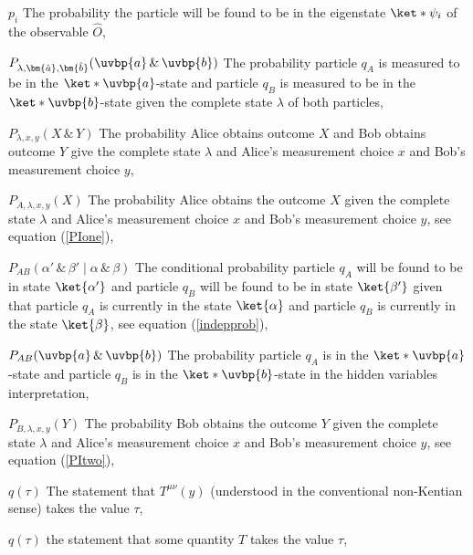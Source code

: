 \begin{thenomenclature}
  \item [{$p_i$}]\begingroup The probability the particle will be found to be in the eigenstate $\ket*{\psi_i}$ of the observable $\hat{O}$, \nomrefpage{}
  \item [{$P_{\lambda,\bm{\hat{a}},\bm{\hat{b}}}(\uvbp{a}\,\&\,\uvbp{b})$}]\begingroup The probability particle $q_A$ is measured to be in the $\ket*{\uvbp{a}}$-state and particle $q_B$ is measured to be in the $\ket*{\uvbp{b}}$-state given the complete state $\lambda$ of both particles, \nomrefpage{}
  \item [{$P_{\lambda,x,y}(X \,\&\, Y)$}]\begingroup The probability  Alice obtains outcome $X$ and Bob obtains outcome $Y$ give the complete state $\lambda$ and Alice's measurement choice $x$ and Bob's measurement choice $y$, \nomrefpage{}
  \item [{$P_{A, \lambda,x,y}(X)$}]\begingroup The probability Alice obtains the outcome $X$ given the complete state $\lambda$ and Alice's measurement choice $x$ and Bob's measurement choice $y$, see equation (\ref{PIone}), \nomrefpage{}
  \item [{$P_{AB}(\alpha'\,\&\,\beta'\mid\alpha\,\&\,\beta)$}]\begingroup The conditional probability particle $q_A$ will be found to be in state $\ket{\alpha'}$ and particle $q_B$ will be found to be in state $\ket{\beta'}$ given that particle $q_A$ is currently in the state $\ket{\alpha}$ and particle $q_B$ is currently in the state $\ket{\beta}$, see equation (\ref{indepprob}), \nomrefpage{}
  \item [{$P_{AB}(\uvbp{a}\,\&\,\uvbp{b})$}]\begingroup The probability particle $q_A$ is in the $\ket*{\uvbp{a}}$-state and particle $q_B$ is in the $\ket*{\uvbp{b}}$-state in the hidden variables interpretation, \nomrefpage{}
  \item [{$P_{B, \lambda,x,y}(Y)$}]\begingroup The probability Bob obtains the outcome $Y$ given the complete state $\lambda$ and Alice's measurement choice $x$ and Bob's measurement choice $y$, see equation (\ref{PItwo}), \nomrefpage{}
  \item [{$q(\tau)$}]\begingroup The statement that $T^{\mu\nu}(y)$ (understood in the conventional non-Kentian sense) takes the value $\tau$, \nomrefpage{}
  \item [{$q(\tau)$}]\begingroup the statement that some quantity $T$  takes the value $\tau$, \nomrefpage{}

\end{thenomenclature}
